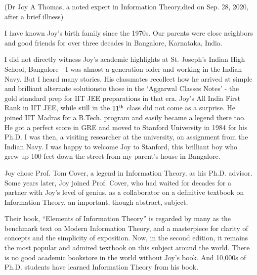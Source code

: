 \begin{center}
\vspace{-.8cm}
(Dr Joy A Thomas, a noted expert in Information Theory,\break died on Sep. 28, 2020, after a brief illness)
\end{center}

\begin{multicols}{2}

I have known Joy’s birth family since the 1970s. Our parents were close neighbors and good friends for over three decades in Bangalore, Karnataka, India.

\vspace{-.1cm}

I did not directly witness Joy’s academic highlights at St. Joseph’s Indian High School, Bangalore - I was almost a generation older and working in the Indian Navy. But I heard many stories.  His classmates recollect how he arrived at simple and brilliant alternate solutionsto those in the ‘Aggarwal Classes Notes’ - the gold standard prep for IIT JEE preparations in that era. Joy’s All India First Rank in IIT JEE, while still in the $11^{\rm th}$ class did not come as a surprise. He joined IIT Madras for a B.Tech. program and easily became a legend there too. He got a perfect score in GRE and moved to Stanford University in 1984 for his Ph.D. I was then, a visiting researcher at the university, on assignment from the Indian Navy. I was happy to welcome Joy to Stanford, this brilliant boy who grew up 100 feet down the street from my parent’s house in Bangalore.

\vspace{-.1cm}

Joy chose Prof. Tom Cover, a legend in Information Theory, as his Ph.D. advisor. Some years later, Joy joined Prof. Cover, who had waited for decades for a partner with Joy’s level of genius, as a collaborator on a definitive textbook on Information Theory, an important, though abstract, subject.

\vspace{-.1cm}

Their book, “Elements of Information Theory” is regarded by many as the benchmark text on Modern Information Theory, and a masterpiece for clarity of concepts and the simplicity of exposition. Now, in the second edition, it remains the most popular and admired textbook on this subject around the world. There is no good academic bookstore in the world without Joy’s book. And 10,000s of Ph.D. students have learned Information Theory from his book.


\end{multicols}
